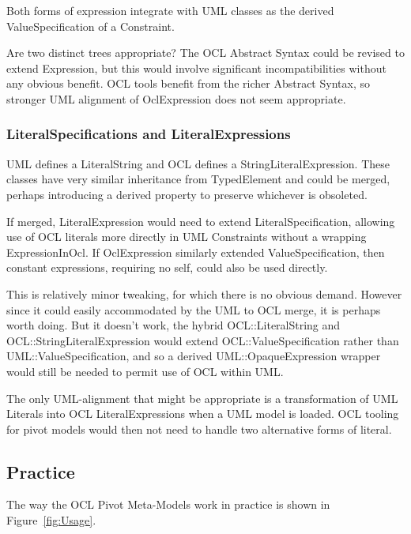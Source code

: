 \documentclass{eceasst}
\begin{document}
Both forms of expression integrate with UML classes as the derived ValueSpecification of a Constraint.

Are two distinct trees appropriate? The OCL Abstract Syntax could be revised to extend Expression, but this would involve significant incompatibilities without any obvious benefit. OCL tools benefit from the richer Abstract Syntax, so stronger UML alignment of OclExpression does not seem appropriate.

\subsubsection{LiteralSpecifications and LiteralExpressions}

UML defines a LiteralString and OCL defines a StringLiteralExpression. These classes have very similar inheritance from TypedElement and could be merged, perhaps introducing a derived property to preserve whichever is obsoleted.

If merged, LiteralExpression would need to extend LiteralSpecification, allowing use of OCL literals more directly in UML Constraints without a wrapping ExpressionInOcl. If OclExpression similarly extended ValueSpecification, then constant expressions, requiring no self, could also be used directly.

This is relatively minor tweaking, for which there is no obvious demand. However since it could easily accommodated by the UML to OCL merge, it is perhaps worth doing. But it doesn't work, the hybrid OCL::LiteralString and OCL::StringLiteralExpression would extend OCL::ValueSpecification rather than UML::ValueSpecification, and so a derived UML::Opaque\-Expression wrapper would still be needed to permit use of OCL within UML. 

The only UML-alignment that might be appropriate is a transformation of UML Literals into OCL LiteralExpressions when a UML model is loaded. OCL tooling for pivot models would then not need to handle two alternative forms of literal. 

\subsection{Practice}

The way the OCL Pivot Meta-Models work in practice is shown in Figure~\ref{fig:Usage}. 
\end{document}
